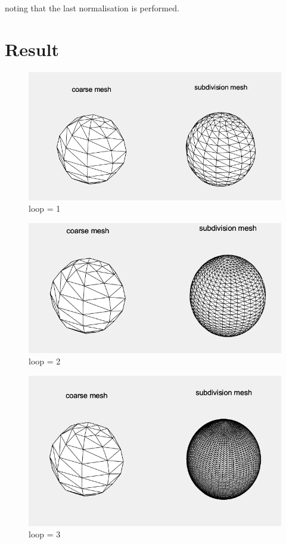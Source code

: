 \documentclass{article}
\begin{document}
	noting that the last normalisation is performed.
	\section{Result}
	\begin{figure}[H]
		\centering
		\includegraphics{1}
		\caption{loop = 1}
		\label{fig:1}
	\end{figure}
	\begin{figure}[H]
		\centering
		\includegraphics{2}
		\caption{loop = 2}
		\label{fig:2}
	\end{figure}
	\begin{figure}[H]
		\centering
		\includegraphics{3}
		\caption{loop = 3}
		\label{fig:3}
	\end{figure}
	
\end{document}
